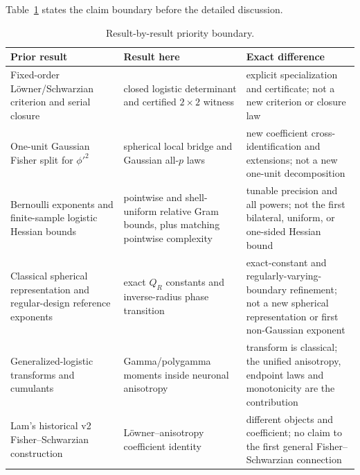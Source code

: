 \documentclass[11pt]{article}
\begin{document}
Table~\ref{tab:priority} states the claim boundary before the detailed discussion.
\begin{table}[H]
\centering
\small
\begin{tabular}{>{\raggedright\arraybackslash}p{}
                >{\raggedright\arraybackslash}p{}
                >{\raggedright\arraybackslash}p{}}
\toprule
Prior result & Result here & Exact difference \\
\midrule
Fixed-order L\"owner/Schwarzian criterion and serial closure
\cite{kozlovski2008,cook2023}
& closed logistic determinant and certified $2\times2$ witness
& explicit specialization and certificate; not a new criterion or closure law \\[3pt]
One-unit Gaussian Fisher split for $\phi'^2$ \cite{amari2019}
& spherical local bridge and Gaussian all-$p$ laws
& new coefficient cross-identification and extensions; not a new one-unit decomposition \\[3pt]
Bernoulli exponents and finite-sample logistic Hessian bounds
\cite{chen2026gd,ostrovskii2021,chardon2024,fisher2023}
& pointwise and shell-uniform relative Gram bounds, plus matching pointwise complexity
& tunable precision and all powers; not the first bilateral, uniform, or one-sided Hessian bound \\[3pt]
Classical spherical representation \cite{cambanis1981} and regular-design reference exponents \cite{chardon2024}
& exact $Q_R$ constants and inverse-radius phase transition
& exact-constant and regularly-varying-boundary refinement; not a new spherical representation or first
non-Gaussian exponent \\[3pt]
Generalized-logistic transforms and cumulants \cite{ojo2004,lee2025}
& Gamma/polygamma moments inside neuronal anisotropy
& transform is classical; the unified anisotropy, endpoint laws and monotonicity are the contribution \\[3pt]
Lam's historical v2 Fisher--Schwarzian construction \cite{lam2026v2}
& L\"owner--anisotropy coefficient identity
& different objects and coefficient; no claim to the first general Fisher--Schwarzian connection \\
\bottomrule
\end{tabular}
\caption{Result-by-result priority boundary.}
\label{tab:priority}
\end{table}
\end{document}

